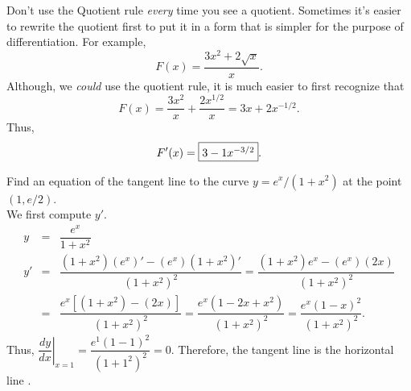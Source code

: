 \documentclass{book}
\begin{document}
%

\begin{Exam} Don't use the Quotient rule \emph{every} time you see a quotient. Sometimes it's easier to rewrite the quotient first to put it in a form that is simpler for the purpose of differentiation. For example, 
\[F(x) = \dfrac{3x^2+2\sqrt{x}}{x}.\] Although, we \emph{could} use the quotient rule, it is much easier to first recognize that \[F(x) = \dfrac{3x^2}{x} + \dfrac{2x^{1/2}}{x} = 3x + 2x^{-1/2}.\] Thus, \[F'(x) = \fbox{$3 - 1x^{-3/2}$}.\]
\end{Exam}\vs

\begin{Exam} Find an equation of the tangent line to the curve $y= e^x/(1+x^2)$ at the point $(1, e/2)$.\\

We first compute $y'$. 
\begin{eqnarray*}
y &=& \dfrac{e^x}{1+x^2}\\
y' &=& \dfrac{(1+x^2)(e^x)' - (e^x)(1+x^2)'}{(1+x^2)^2} =  \dfrac{(1+x^2)e^x - (e^x)(2x)}{(1+x^2)^2}\\
&=&  \dfrac{e^x[(1+x^2) - (2x)]}{(1+x^2)^2} =  \dfrac{e^x(1-2x+x^2)}{(1+x^2)^2} =  \dfrac{e^x(1-x)^2}{(1+x^2)^2}.
\end{eqnarray*} Thus, $\left.\dfrac{dy}{dx}\right\vert_{x=1} = \dfrac{e^1(1-1)^2}{(1+1^2)^2}  = 0$. Therefore, the tangent line is the horizontal line .
\end{Exam}
\end{document}
